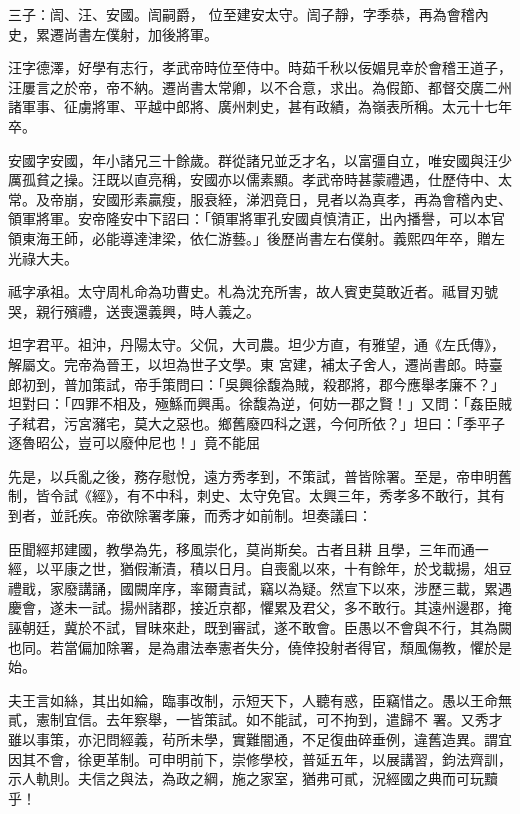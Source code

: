 \begin{pinyinscope}
 三子：訚、汪、安國。訚嗣爵，
 位至建安太守。訚子靜，字季恭，再為會稽內史，累遷尚書左僕射，加後將軍。



 汪字德澤，好學有志行，孝武帝時位至侍中。時茹千秋以佞媚見幸於會稽王道子，汪屢言之於帝，帝不納。遷尚書太常卿，以不合意，求出。為假節、都督交廣二州諸軍事、征虜將軍、平越中郎將、廣州刺史，甚有政績，為嶺表所稱。太元十七年卒。



 安國字安國，年小諸兄三十餘歲。群從諸兄並乏才名，以富彊自立，唯安國與汪少厲孤貧之操。汪既以直亮稱，安國亦以儒素顯。孝武帝時甚蒙禮遇，仕歷侍中、太
 常。及帝崩，安國形素贏瘦，服衰絰，涕泗竟日，見者以為真孝，再為會稽內史、領軍將軍。安帝隆安中下詔曰：「領軍將軍孔安國貞慎清正，出內播譽，可以本官領東海王師，必能導達津梁，依仁游藝。」後歷尚書左右僕射。義熙四年卒，贈左光祿大夫。



 祗字承祖。太守周札命為功曹史。札為沈充所害，故人賓吏莫敢近者。祗冒刃號哭，親行殯禮，送喪還義興，時人義之。



 坦字君平。祖沖，丹陽太守。父侃，大司農。坦少方直，有雅望，通《左氏傳》，解屬文。完帝為晉王，以坦為世子文學。東
 宮建，補太子舍人，遷尚書郎。時臺郎初到，普加策試，帝手策問曰：「吳興徐馥為賊，殺郡將，郡今應舉孝廉不？」坦對曰：「四罪不相及，殛鯀而興禹。徐馥為逆，何妨一郡之賢！」又問：「姦臣賊子弒君，污宮瀦宅，莫大之惡也。鄉舊廢四科之選，今何所依？」坦曰：「季平子逐魯昭公，豈可以廢仲尼也！」竟不能屈



 先是，以兵亂之後，務存慰悅，遠方秀孝到，不策試，普皆除署。至是，帝申明舊制，皆令試《經》，有不中科，刺史、太守免官。太興三年，秀孝多不敢行，其有到者，並託疾。帝欲除署孝廉，而秀才如前制。坦奏議曰：



 臣聞經邦建國，教學為先，移風崇化，莫尚斯矣。古者且耕
 且學，三年而通一經，以平康之世，猶假漸漬，積以日月。自喪亂以來，十有餘年，於戈載揚，俎豆禮戢，家廢講誦，國闕庠序，率爾責試，竊以為疑。然宣下以來，涉歷三載，累遇慶會，遂未一試。揚州諸郡，接近京都，懼累及君父，多不敢行。其遠州邊郡，掩誣朝廷，冀於不試，冒昧來赴，既到審試，遂不敢會。臣愚以不會與不行，其為闕也同。若當偏加除署，是為肅法奉憲者失分，僥倖投射者得官，頹風傷教，懼於是始。



 夫王言如絲，其出如綸，臨事改制，示短天下，人聽有惑，臣竊惜之。愚以王命無貳，憲制宜信。去年察舉，一皆策試。如不能試，可不拘到，遣歸不
 署。又秀才雖以事策，亦汜問經義，茍所未學，實難闇通，不足復曲碎垂例，違舊造異。謂宜因其不會，徐更革制。可申明前下，崇修學校，普延五年，以展講習，鈞法齊訓，示人軌則。夫信之與法，為政之綱，施之家室，猶弗可貳，況經國之典而可玩黷乎！




\end{pinyinscope}
